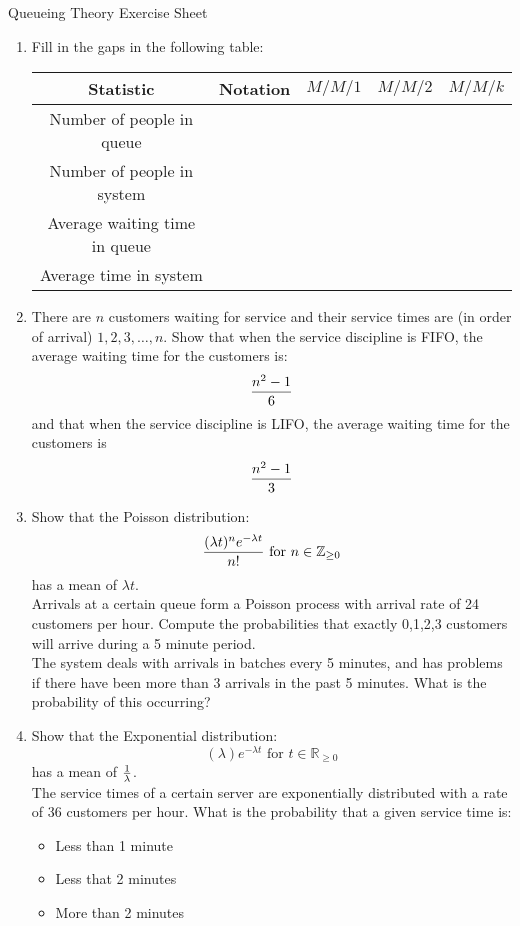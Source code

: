 \documentclass[12pt]{article}
\begin{document}
\begin{center}
\Huge{Queueing Theory Exercise Sheet}
\end{center}

\begin{enumerate}
\item Fill in the gaps in the following table:
\begin{center}
\begin{tabular}{c|c|c|c|c}
\hline
Statistic& Notation & $M/M/1$ & $M/M/2$ & $M/M/k$ \\\hline
Number of people in queue  &  &          &         \\
Number of people in system &  &          &         \\
Average waiting time in queue &  &          &         \\
Average time in system &  &          &
\end{tabular}
\end{center}

\item There are $n$ customers waiting for service and their service times are (in order of arrival) $1,2,3,\dots,n$. Show that when the service discipline is FIFO, the average waiting time for the customers is:
    $${n^2-1\over6}$$
    and that when the service discipline is LIFO, the average waiting time for the customers is
    $${n^2-1\over3}$$

\item Show that the Poisson distribution:
$${(\lambda t)^ne^{-\lambda t}\over n!}\text{ for }n\in\mathbb{Z}_{\geq0}$$
has a mean of $\lambda t$.\\
Arrivals at a certain queue form a Poisson process with arrival rate of 24 customers per hour. Compute the probabilities that exactly 0,1,2,3 customers will arrive during a 5 minute period.\\
The system deals with arrivals in batches every 5 minutes, and has problems if there have been more than 3 arrivals in the past 5 minutes. What is the probability of this occurring?

\item Show that the Exponential distribution:
$${(\lambda )e^{-\lambda t}}\text{ for }t\in\mathbb{R}_{\geq0}$$
has a mean of ${1\over \lambda}$.\\
The service times of a certain server are exponentially distributed with a rate of 36 customers per hour. What is the probability that a given service time is:
\begin{itemize}
\item Less than 1 minute
\item Less that 2 minutes
\item More than 2 minutes
\end{itemize}


\end{enumerate}
\end{document}
